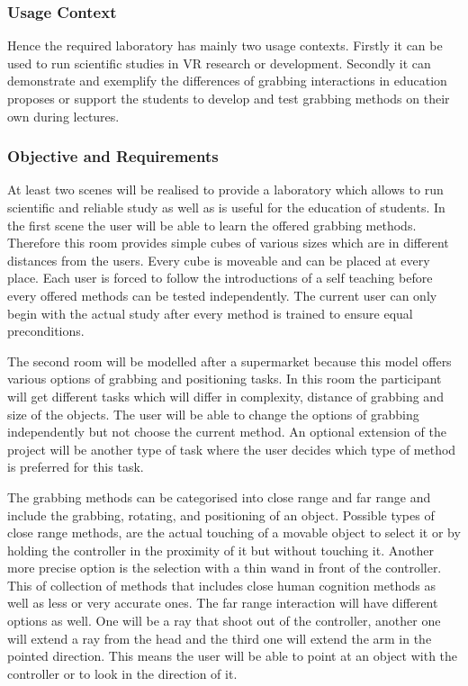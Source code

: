 \subsubsection{Usage Context}\label{sec:PMUsageContext} 

Hence the required laboratory has mainly two usage contexts. Firstly it can be used to run scientific studies in VR research or development. Secondly it can demonstrate and exemplify the differences of grabbing interactions in education proposes or support the students to develop and test grabbing methods on their own during lectures. 

\subsubsection{Objective and Requirements}\label{sec:PMRequirements}


At least two scenes will be realised to provide a laboratory which allows to run scientific and reliable study as well as is useful for the education of students. In the first scene the user will be able to learn the offered grabbing methods. Therefore this room provides simple cubes of various sizes which are in different distances from the users. Every cube is moveable and can be placed at every place. Each user is forced to follow the introductions of a self teaching before every offered methods can be tested independently. The current user can only begin with the actual study after every method is trained to ensure equal preconditions.

The second room will be modelled after a supermarket because this model offers various options of grabbing and positioning tasks. In this room the participant will get different tasks which will differ in complexity, distance of grabbing and size of the objects. The user will be able to change the options of grabbing independently but not choose the current method. An optional extension of the project will be another type of task where the user decides which type of method is preferred for this task.

The grabbing methods can be categorised into close range and far range and include the grabbing, rotating, and positioning of an object. Possible types of close range methods, are the actual touching of a movable object to select it or by holding the controller in the proximity of it but without touching it. Another more precise option is the selection with a thin wand in front of the controller. This of collection of methods that includes close human cognition methods as well as less or very accurate ones. 
The far range interaction will have different options as well. One will be a ray that shoot out of the controller, another one will extend a ray from the head and the third one will extend the arm in the pointed direction. This means the user will be able to point at an object with the controller or to look in the direction of it.

